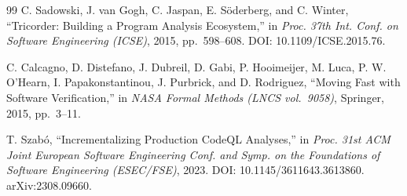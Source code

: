 \documentclass[11pt,a4paper]{article}
\begin{document}
\begin{thebibliography}{99}
 C. Sadowski, J. van Gogh, C. Jaspan, E. S\"{o}derberg, and C. Winter, ``Tricorder: Building a Program Analysis Ecosystem,'' in \textit{Proc. 37th Int. Conf. on Software Engineering (ICSE)}, 2015, pp.~598--608. DOI: 10.1109/ICSE.2015.76.

 C. Calcagno, D. Distefano, J. Dubreil, D. Gabi, P. Hooimeijer, M. Luca, P. W. O'Hearn, I. Papakonstantinou, J. Purbrick, and D. Rodriguez, ``Moving Fast with Software Verification,'' in \textit{NASA Formal Methods (LNCS vol.~9058)}, Springer, 2015, pp.~3--11.

 T. Szab\'{o}, ``Incrementalizing Production CodeQL Analyses,'' in \textit{Proc. 31st ACM Joint European Software Engineering Conf. and Symp. on the Foundations of Software Engineering (ESEC/FSE)}, 2023. DOI: 10.1145/3611643.3613860. arXiv:2308.09660.

\end{thebibliography}
\end{document}
